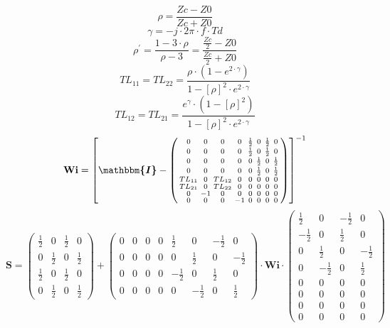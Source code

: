 \[ \rho =  \frac{ Zc-Z0 }{ Zc + Z0 } \]
\[ \gamma =  -j \cdot 2 \pi \cdot f \cdot Td \]
\[ \rho^\prime = \frac{1-3\cdot \rho }{\rho - 3} =  \frac{ \frac{ Zc
}{2} - Z0  }{ \frac{ Zc }{2} + Z0 } \]
\[ TL_{11}=TL_{22} =  \frac{ \rho \cdot \left( 1 - e^{2 \cdot \gamma }
\right) }{ 1 - \left[ \rho \right]^2 \cdot e^{2 \cdot \gamma }  } \]
\[ TL_{12}=TL_{21} =  \frac{ e^{\gamma} \cdot \left( 1 - \left[ \rho
\right] ^2 \right) }{ 1 - \left[ \rho \right]^2 \cdot e^{2 \cdot
\gamma }  }  \]
\[ \mathbf{Wi} =  \left[ \boldsymbol{\mathbbm{I}}  -
\left(\begin{smallmatrix} 0 & 0 & 0 & 0 &  \frac{ 1 }{ 2 }  & 0 &
\frac{ 1 }{2}  & 0 \\ 0 & 0 & 0 & 0 &  \frac{ 1 }{2}  & 0 &  \frac{ 1
}{ 2 }  & 0 \\ 0 & 0 & 0 & 0 & 0 &  \frac{ 1 }{ 2 }  & 0 &  \frac{ 1
}{2}  \\ 0 & 0 & 0 & 0 & 0 &  \frac{ 1 }{2}  & 0 &  \frac{ 1 }{ 2 }
\\ TL_{11} & 0 & TL_{12} & 0 & 0 & 0 & 0 & 0 \\ TL_{21} & 0 & TL_{22}
& 0 & 0 & 0 & 0 & 0 \\ 0 & -1 & 0 & 0 & 0 & 0 & 0 & 0 \\ 0 & 0 & 0 &
-1 & 0 & 0 & 0 & 0 \end{smallmatrix}\right) \right]^{-1}  \]
\[ \mathbf{S} = \left(\begin{smallmatrix}  \frac{ 1 }{2}  & 0 &
\frac{ 1 }{ 2 }  & 0 \\ 0 &  \frac{ 1 }{2}  & 0 &  \frac{ 1 }{ 2 }  \\
\frac{ 1 }{ 2 }  & 0 &  \frac{ 1 }{2}  & 0 \\ 0 &  \frac{ 1 }{ 2 }  &
0 &  \frac{ 1 }{2}  \end{smallmatrix}\right) +
\left(\begin{smallmatrix} 0 & 0 & 0 & 0 &  \frac{ 1 }{ 2 }  & 0 &
-\frac{ 1 }{ 2 }  & 0 \\ 0 & 0 & 0 & 0 & 0 &  \frac{ 1 }{ 2 }  & 0 &
-\frac{ 1 }{ 2 }  \\ 0 & 0 & 0 & 0 &  -\frac{ 1 }{ 2 }  & 0 &  \frac{
1 }{ 2 }  & 0 \\ 0 & 0 & 0 & 0 & 0 &  -\frac{ 1 }{ 2 }  & 0 &  \frac{
1 }{ 2 }  \end{smallmatrix}\right) \cdot \mathbf{Wi}
\cdot\left(\begin{smallmatrix}  \frac{ 1 }{ 2 }  & 0 &  -\frac{ 1 }{ 2
}  & 0 \\  -\frac{ 1 }{ 2 }  & 0 &  \frac{ 1 }{ 2 }  & 0 \\ 0 &
\frac{ 1 }{ 2 }  & 0 &  -\frac{ 1 }{ 2 }  \\ 0 &  -\frac{ 1 }{ 2 }  &
0 &  \frac{ 1 }{ 2 }  \\ 0 & 0 & 0 & 0 \\ 0 & 0 & 0 & 0 \\ 0 & 0 & 0 &
0 \\ 0 & 0 & 0 & 0 \end{smallmatrix}\right) \]
